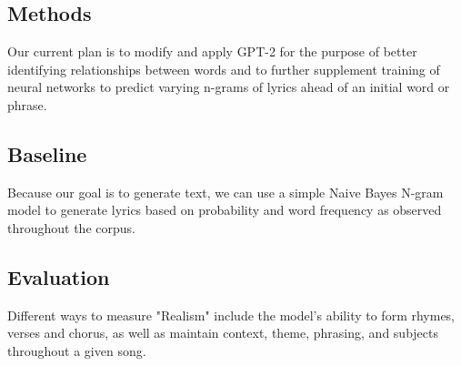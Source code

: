 \documentclass[11pt]{article}
\begin{document}
\subsection{Methods} %
Our current plan is to modify and apply GPT-2 for the purpose of better identifying relationships between words and to further supplement training of neural networks to predict varying n-grams of lyrics ahead of an initial word or phrase.
\subsection{Baseline} %
Because our goal is to generate text, we can use a simple Naive Bayes N-gram model to generate lyrics based on probability and word frequency as observed throughout the corpus.
\subsection{Evaluation} %
Different ways to measure "Realism" include the model's ability to form rhymes, verses and chorus, as well as maintain context, theme, phrasing, and subjects throughout a given song.


%
%
\end{document}
